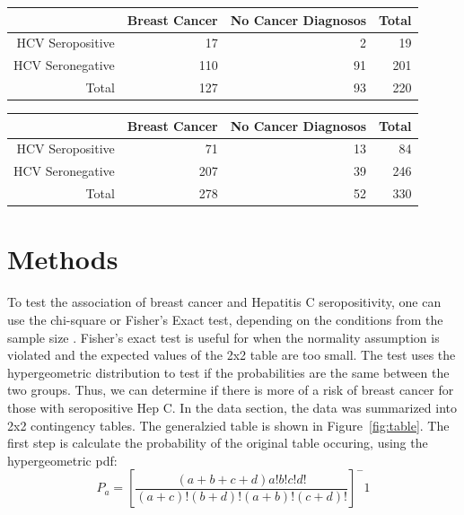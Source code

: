 \documentclass[12pt, titlepage]{article}
\begin{document}
\vspace{1cm}

\begin{center}
\label{tab:younger}
\begin{tabular}{rrrr}
  \toprule
  & Breast Cancer & No Cancer Diagnosos & Total\\
  \midrule
  HCV Seropositive & 17 & 2 & 19 \\ 
  HCV Seronegative & 110 & 91 & 201 \\ 
  \midrule
  Total & 127 & 93 & 220 \\ 
  \bottomrule
\end{tabular}
\end{center}

\vspace{1cm}

\begin{center}
\label{tab:older}
\begin{tabular}{rrrr}
  \toprule
  & Breast Cancer & No Cancer Diagnosos & Total\\
  \midrule
  HCV Seropositive & 71 & 13 & 84 \\ 
  HCV Seronegative & 207 & 39 & 246 \\
  \midrule 
  Total & 278 & 52 & 330 \\ 
  \bottomrule
\end{tabular}
\end{center}

\vspace{1cm}



\section{Methods}
\label{sec:methods}

To test the association of breast cancer and Hepatitis C seropositivity, one can use
the chi-square or Fisher's Exact test, depending on the
conditions from the sample size \citep{warner2013testing}. Fisher's
exact test is useful for when the normality assumption is violated 
and the expected values of the 2x2 table are too small. The test uses 
the hypergeometric distribution to test if the probabilities are
the same between the two groups. Thus, we can determine if there is 
more of a risk of breast cancer for those with seropositive Hep C.
In the data section, the data was summarized into 2x2 contingency tables.
The generalzied table is shown in Figure~\ref{fig:table}.
The first step is calculate the probability of the original table occuring,
using the hypergeometric pdf:
\begin{equation}
P_a=[\frac{(a+b+c+d)a!b!c!d!}{(a+c)!(b+d)!(a+b)!(c+d)!}]^-1
\end{equation}
\end{document}
